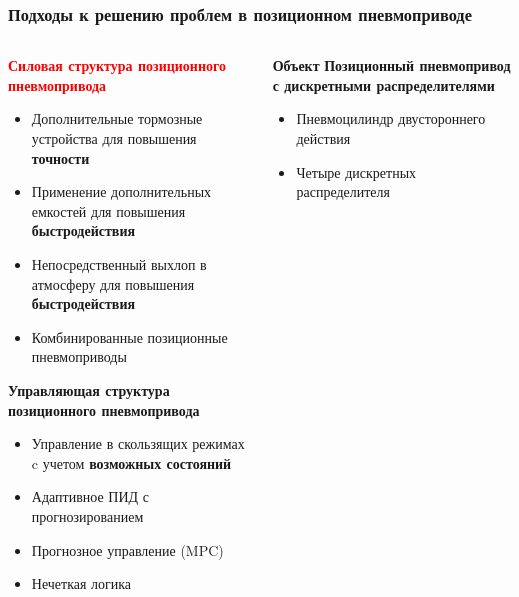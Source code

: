 \begin{frame}
	\frametitle{Подходы к решению проблем в позиционном пневмоприводе}

	\begin{columns}[T]
		\begin{column}{0.48\textwidth}
			\textcolor{red}{ \scriptsize\textbf{Силовая структура позиционного пневмопривода}}

			\begin{itemize}\setlength{\itemsep}{0pt}
				\item \scriptsize Дополнительные тормозные устройства для повышения \textbf{точности}
				\item \scriptsize Применение дополнительных емкостей для повышения \textbf{быстродействия}
				\item \scriptsize Непосредственный выхлоп в атмосферу для повышения \textbf{быстродействия}
				\item \scriptsize Комбинированные позиционные пневмоприводы
			\end{itemize}

			\textcolor{green!50!black}{\scriptsize\textbf{Управляющая структура позиционного пневмопривода}}

			\begin{itemize}\setlength{\itemsep}{0pt}
				\item \scriptsize Управление в скользящих режимах c учетом \textbf{возможных состояний}
				\item \scriptsize Адаптивное ПИД с прогнозированием
				\item \scriptsize Прогнозное управление (MPC)
				\item \scriptsize Нечеткая логика
			\end{itemize}
		\end{column}

		\begin{column}{0.48\textwidth}
			\begin{block}{\scriptsize \textbf{Объект}}
				\scriptsize \textbf{Позиционный пневмопривод с дискретными распределителями}
				\begin{itemize}
					\item \scriptsize Пневмоцилиндр двустороннего действия
					\item \scriptsize Четыре дискретных распределителя
				\end{itemize}
			\end{block}

			\vspace{0.3cm}


\end{column}
\end{columns}
\end{frame}
